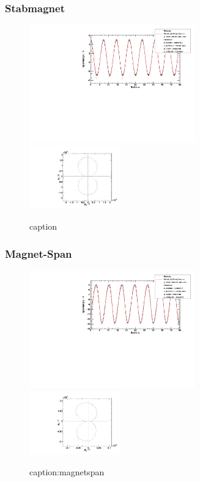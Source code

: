 \subsubsection{Stabmagnet}
\begin{figure}[H]
\begin{center}
  \includegraphics[width=0.64\textwidth]{../img/fit_Magnet.pdf}
  \includegraphics[width=0.35\textwidth]{../img/polar_Magnet.pdf}
  \caption{caption}
  \label{img:magnet}
\end{center}
\end{figure}

\subsubsection{Magnet-Span}
\begin{figure}[H]
\begin{center}
  \includegraphics[width=0.64\textwidth]{../img/fit_Magnetspan_45grad.pdf}
  \includegraphics[width=0.35\textwidth]{../img/polar_Magnetspan_45grad.pdf}
  \caption{caption:magnetspan}
  \label{img:}
\end{center}
\end{figure}

